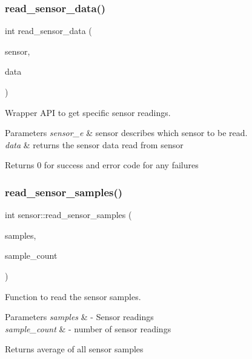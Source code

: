 \subsubsection{\texorpdfstring{read\+\_\+sensor\+\_\+data()}{read\_sensor\_data()}\hspace{0.1cm}{\footnotesize\ttfamily [3/3]}}
{\footnotesize\ttfamily int read\+\_\+sensor\+\_\+data (\begin{DoxyParamCaption}\item[{\hyperlink{group___base_sensors_module_ga241bbfb8b20d2f411c4c10bb9703288c}{sensor\+\_\+e}}]{sensor,  }\item[{float $\ast$}]{data }\end{DoxyParamCaption})}



Wrapper A\+PI to get specific sensor readings. 


\begin{DoxyParams}{Parameters}
{\em sensor\+\_\+e} & sensor describes which sensor to be read.\\
\hline
{\em data} & returns the sensor data read from sensor\\
\hline
\end{DoxyParams}
\begin{DoxyReturn}{Returns}
0 for success and error code for any failures 
\end{DoxyReturn}
\mbox{\label{group___ventilator_module_gaa646dcf1c12ed21dd027a49721e27b04}} 
\subsubsection{\texorpdfstring{read\+\_\+sensor\+\_\+samples()}{read\_sensor\_samples()}}
{\footnotesize\ttfamily int sensor\+::read\+\_\+sensor\+\_\+samples (\begin{DoxyParamCaption}\item[{float $\ast$}]{samples,  }\item[{int}]{sample\+\_\+count }\end{DoxyParamCaption})}



Function to read the sensor samples. 


\begin{DoxyParams}{Parameters}
{\em samples} & -\/ Sensor readings \\
\hline
{\em sample\+\_\+count} & -\/ number of sensor readings \\
\hline
\end{DoxyParams}
\begin{DoxyReturn}{Returns}
average of all sensor samples 
\end{DoxyReturn}
\mbox{\label{group___ventilator_module_gacc2551ecc6e2b9542a747aed535eda43}} 
